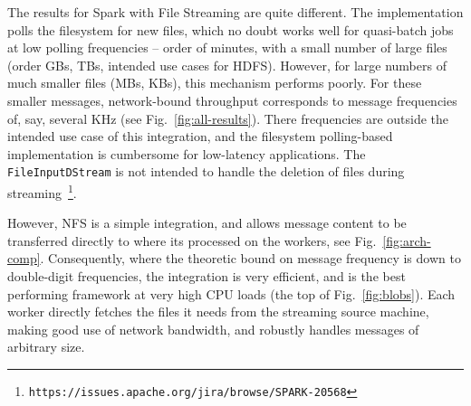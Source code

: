 \documentclass[conference]{IEEEtran}
\begin{document}
The results for Spark with File Streaming are quite different. The implementation polls the filesystem for new files, which no doubt works well for quasi-batch jobs at low polling frequencies -- order of minutes, with a small number of large files (order GBs, TBs, intended use cases for HDFS). However, for large numbers of much smaller files (MBs, KBs), this mechanism performs poorly. For these smaller messages, network-bound throughput corresponds to message frequencies of, say, several KHz (see Fig.~\ref{fig:all-results}). There frequencies are outside the intended use case of this integration, and the filesystem polling-based implementation is cumbersome for low-latency applications. %
The \texttt{FileInputDStream} is not intended to handle the deletion of files during streaming~\footnote{\texttt{https://issues.apache.org/jira/browse/SPARK-20568}}.

However, %
NFS is a simple integration, and allows message content to be transferred directly to where its processed on the workers, see Fig.~\ref{fig:arch-comp}. Consequently, where the theoretic bound on message frequency is down to double-digit frequencies, %
the integration is very efficient, and is the best performing framework at very high CPU loads (the top of Fig.~\ref{fig:blobs}). Each worker directly fetches the files it needs from the streaming source machine, making good use of network bandwidth, and robustly handles messages of arbitrary size. 
\end{document}
